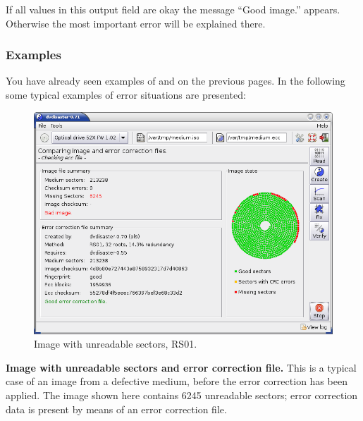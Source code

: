 \bigskip

If all values in this output field are okay the
message ``\textcolor{dkgreen}{Good image.}'' appears.
Otherwise the most important error will be explained there. 

\newpage

\subsubsection{Examples}

You have already seen examples
of 
and  on
the previous pages. In the following some typical examples
of error situations are presented:

\bigskip

\begin{figure}[h]
\centerline{\includegraphics[width=\textwidth]{screenshots/info-bad-rs01.png}}
\caption{Image with unreadable sectors, RS01.}
\label{howto-info-bad-rs01}
\end{figure}

{\bf Image with unreadable sectors and error correction file.} This is a typical
case of an image from a defective medium, before the error correction has been
applied. The image shown here
contains 6245 unreadable sectors; error correction data is present
by means of an error correction file. 

\newpage

